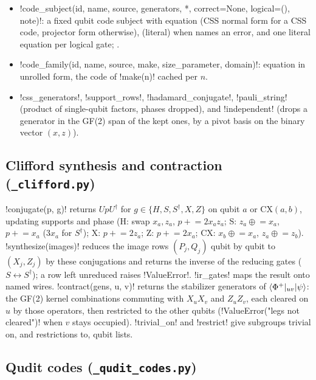 \begin{itemize}
  with \py!css_into! (CSS codes only).
\item \py!code_subject(id, name, source, generators, *, correct=None, logical=(), note)!: a
  fixed qubit code subject with equation  (CSS normal form for a CSS code,
  projector form otherwise),  (literal) when  names an error,
  and one literal equation per logical gate; .
\item \py!code_family(id, name, source, make, size_parameter, domain)!: equation
   in unrolled form, the code of \py!make(n)! cached per $n$.
\item \py!css_generators!, \py!support_rows!, \py!hadamard_conjugate!, \py!pauli_string!
  (product of single-qubit factors, phases dropped), and \py!independent! (drops a generator in
  the GF(2) span of the kept ones, by a pivot basis on the binary vector $(x,z)$).
\end{itemize}

\subsection{Clifford synthesis and contraction (\texttt{\_clifford.py})}

\py!conjugate(p, g)! returns $UpU^\dagger$ for $g\in\{H, S, S^\dagger, X, Z\}$ on qubit $a$ or
CX$(a,b)$, updating supports and phase (H: swap $x_a,z_a$, $p\mathrel{+}=2x_az_a$; S: $z_a
\mathrel{\oplus}= x_a$, $p\mathrel{+}=x_a$ ($3x_a$ for $S^\dagger$); X: $p\mathrel{+}=2z_a$; Z:
$p\mathrel{+}=2x_a$; CX: $x_b\mathrel{\oplus}=x_a$, $z_a\mathrel{\oplus}=z_b$).
\py!synthesize(images)! reduces the image rows $(P_j, Q_j)$ qubit by qubit to $(X_j, Z_j)$ by
these conjugations and returns the inverse of the reducing gates ($S\leftrightarrow S^\dagger$);
a row left unreduced raises \py!ValueError!. \py!ir_gates! maps the result onto named wires.
\py!contract(gens, u, v)! returns the stabilizer generators of $\langle \Phi^+ \rvert_{uv}\lvert \psi \rangle$:
the GF(2) kernel combinations commuting with $X_uX_v$ and $Z_uZ_v$, each cleared on $u$ by those
operators, then restricted to the other qubits (\py!ValueError("legs not cleared")! when $v$
stays occupied). \py!trivial_on! and \py!restrict! give subgroups trivial on, and restrictions
to, qubit lists.

\subsection{Qudit codes (\texttt{\_qudit\_codes.py})}


